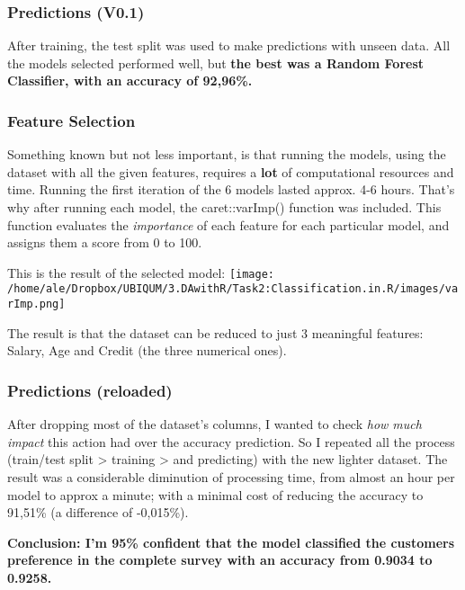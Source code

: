 \documentclass[
]{article}
\begin{document}
\hypertarget{predictions-v0.1}{%
\subsubsection{Predictions (V0.1)}\label{predictions-v0.1}}

After training, the test split was used to make predictions with unseen
data. All the models selected performed well, but \textbf{the best was a
Random Forest Classifier, with an accuracy of 92,96\%.}

\hypertarget{feature-selection}{%
\subsubsection{Feature Selection}\label{feature-selection}}

Something known but not less important, is that running the models,
using the dataset with all the given features, requires a \textbf{lot}
of computational resources and time. Running the first iteration of the
6 models lasted approx. 4-6 hours. That's why after running each model,
the caret::varImp() function was included. This function evaluates the
\emph{importance} of each feature for each particular model, and assigns
them a score from 0 to 100.

This is the result of the selected model:
\texttt{[image: /home/ale/Dropbox/UBIQUM/3.DAwithR/Task2:Classification.in.R/images/varImp.png]}

The result is that the dataset can be reduced to just 3 meaningful
features: Salary, Age and Credit (the three numerical ones).

\hypertarget{predictions-reloaded}{%
\subsubsection{Predictions (reloaded)}\label{predictions-reloaded}}

After dropping most of the dataset's columns, I wanted to check
\emph{how much impact} this action had over the accuracy prediction. So
I repeated all the process (train/test split \textgreater{} training
\textgreater{} and predicting) with the new lighter dataset. The result
was a considerable diminution of processing time, from almost an hour
per model to approx a minute; with a minimal cost of reducing the
accuracy to 91,51\% (a difference of -0,015\%).

\textbf{Conclusion: I'm 95\% confident that the model classified the
customers preference in the complete survey with an accuracy from 0.9034
to 0.9258.}
\end{document}
